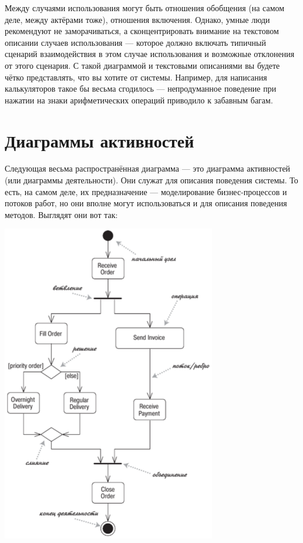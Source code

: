 \documentclass[a5paper]{article}
\begin{document}
Между случаями использования могут быть отношения обобщения (на самом деле, между актёрами тоже), отношения включения. Однако, умные люди рекомендуют не заморачиваться, а сконцентрировать внимание на текстовом описании случаев использования --- которое должно включать типичный сценарий взаимодействия в этом случае использования и возможные отклонения от этого сценария. С такой диаграммой и текстовыми описаниями вы будете чётко представлять, что вы хотите от системы. Например, для написания калькуляторов такое бы весьма сгодилось --- непродуманное поведение при нажатии на знаки арифметических операций приводило к забавным багам.

\section{Диаграммы активностей}

Следующая весьма распространённая диаграмма --- это диаграмма активностей (или диаграммы деятельности). Они служат для описания поведения системы. То есть, на самом деле, их предназначение --- моделирование бизнес-процессов и потоков работ, но они вполне могут использоваться и для описания поведения методов. Выглядят они вот так:

\begin{center}
    \includegraphics[width=0.7\textwidth]{activityDiagram.png}
\end{center}
\end{document}
